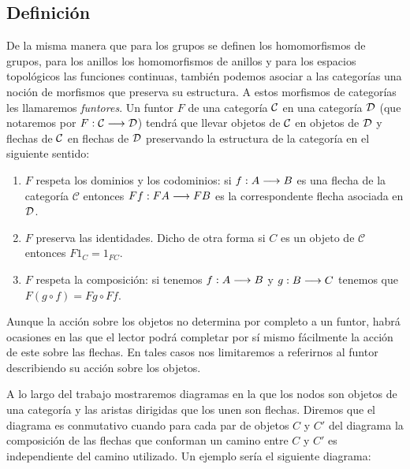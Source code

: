 \subsection{Definición}
De la misma manera que para los grupos se definen los homomorfismos
de grupos, para los anillos los homomorfismos de anillos y para los
espacios topológicos las funciones continuas, también
podemos asociar a las categorías una noción de morfismos que preserva
su estructura. A estos morfismos de categorías les llamaremos
\emph{funtores}. Un funtor $F$ de una categoría
$\mathcal{C}$ en una categoría $\mathcal{D}$ (que notaremos por $F : \mathcal{C}\longrightarrow \mathcal{D}$)
tendrá que llevar objetos de $\mathcal{C}$ en objetos de $\mathcal{D}$ y flechas
de $\mathcal{C}$ en flechas de $\mathcal{D}$ preservando la estructura de la
categoría en el siguiente sentido:
\begin{enumerate}
\item $F$ respeta los dominios y los codominios:
si $f : A\longrightarrow B$ es una flecha
de la categoría $\mathcal{C}$ entonces
$F f : F A\longrightarrow F B$ es la correspondente flecha asociada
en $\mathcal{D}$.
\item $F$ preserva las identidades. Dicho de otra forma si $C$ es un
objeto de $\mathcal{C}$ entonces $F 1_C = 1_{F C}$.
\item $F$ respeta la composición: si tenemos $f: A\longrightarrow B$ y
$g : B\longrightarrow C$ tenemos que $F (g\circ f) = F g \circ F f$.
\end{enumerate}

Aunque la acción sobre los objetos
no determina por completo a un funtor, habrá ocasiones en las que
el lector podrá completar por sí mismo fácilmente la acción de este
sobre las flechas. En tales casos nos limitaremos a referirnos
al funtor describiendo su acción sobre los objetos.

A lo largo del trabajo mostraremos diagramas en la que los nodos
son objetos de una categoría y las aristas dirigidas
que los unen son flechas.
Diremos que el diagrama es conmutativo cuando para cada par
de objetos $C$ y $C'$ del diagrama la composición
de las flechas que conforman un camino entre $C$ y $C'$ es independiente
del camino utilizado. Un ejemplo sería el siguiente diagrama:

\begin{center}
\end{center}

